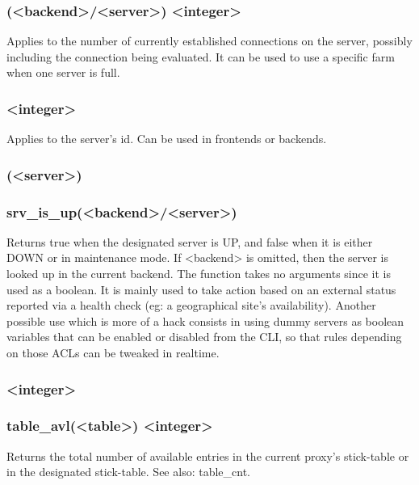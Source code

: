 \subsubsection[srv\_conn]{ (<backend>/<server>) <integer>}

Applies to the number of currently established connections on the server,
possibly including the connection being evaluated.
It can be used to use a specific farm when one server is full.

\subsubsection[srv\_id]{ <integer>}

Applies to the server's id. Can be used in frontends or backends.

\subsubsection[srv\_is\_up]{ (<server>)}
\subsubsection*{srv\_is\_up(<backend>/<server>)}

Returns true when the designated server is UP, and false when it is either
DOWN or in maintenance mode. If <backend> is omitted, then the server is
looked up in the current backend. The function takes no arguments since it
is used as a boolean. It is mainly used to take action based on an external
status reported via a health check (eg: a geographical site's availability).
Another possible use which is more of a hack consists in using dummy servers
as boolean variables that can be enabled or disabled from the CLI, so that
rules depending on those ACLs can be tweaked in realtime.

\subsubsection[table\_avl]{ <integer>}
\subsubsection*{table\_avl(<table>) <integer>}

Returns the total number of available entries in the current proxy's
stick-table or in the designated stick-table.
See also: table\_cnt.

